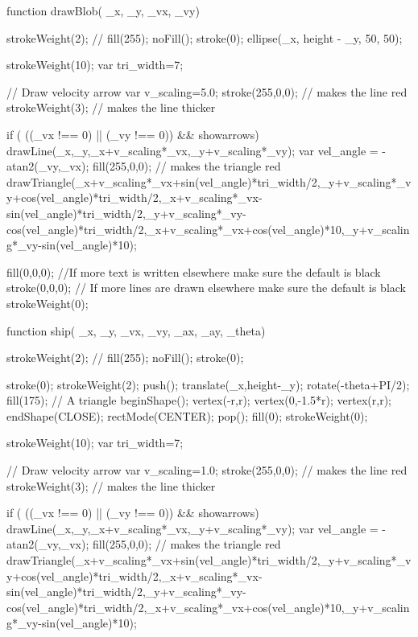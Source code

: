 \documentclass{ximera}
\begin{document}
\begin{javascriptCode}
function drawBlob( _x,  _y, _vx, _vy){
    strokeWeight(2);
    //    fill(255);
    noFill();
    stroke(0);
    ellipse(_x, height - _y, 50, 50);  
  
            strokeWeight(10);
    var tri_width=7;

    // Draw velocity arrow
    var v_scaling=5.0;
    stroke(255,0,0); // makes the line red
    strokeWeight(3); // makes the line thicker

    if ( ((_vx !== 0) || (_vy !== 0)) && showarrows) {
        drawLine(_x,_y,_x+v_scaling*_vx,_y+v_scaling*_vy);
        var vel_angle = -atan2(_vy,_vx);
        fill(255,0,0); // makes the triangle red
        drawTriangle(_x+v_scaling*_vx+sin(vel_angle)*tri_width/2,_y+v_scaling*_vy+cos(vel_angle)*tri_width/2,_x+v_scaling*_vx-sin(vel_angle)*tri_width/2,_y+v_scaling*_vy-cos(vel_angle)*tri_width/2,_x+v_scaling*_vx+cos(vel_angle)*10,_y+v_scaling*_vy-sin(vel_angle)*10);
    }
  


      fill(0,0,0); //If more text is written elsewhere make sure the default is black
    stroke(0,0,0); // If more lines are drawn elsewhere make sure the default is black
    strokeWeight(0);

}



function ship( _x,  _y, _vx, _vy, _ax, _ay, _theta)
{
    strokeWeight(2);
    //    fill(255);
    noFill();
    stroke(0);

    stroke(0);
    strokeWeight(2);
    push();
    translate(_x,height-_y);
    rotate(-theta+PI/2);
    fill(175);
    // A triangle
    beginShape();
    vertex(-r,r);
    vertex(0,-1.5*r);
    vertex(r,r);
    endShape(CLOSE);
    rectMode(CENTER);
    pop();
    fill(0);
    strokeWeight(0);
  
  
  
    strokeWeight(10);
    var tri_width=7;

    // Draw velocity arrow
    var v_scaling=1.0;
    stroke(255,0,0); // makes the line red
    strokeWeight(3); // makes the line thicker

    if ( ((_vx !== 0) || (_vy !== 0)) && showarrows) {
        drawLine(_x,_y,_x+v_scaling*_vx,_y+v_scaling*_vy);
        var vel_angle = -atan2(_vy,_vx);
        fill(255,0,0); // makes the triangle red
        drawTriangle(_x+v_scaling*_vx+sin(vel_angle)*tri_width/2,_y+v_scaling*_vy+cos(vel_angle)*tri_width/2,_x+v_scaling*_vx-sin(vel_angle)*tri_width/2,_y+v_scaling*_vy-cos(vel_angle)*tri_width/2,_x+v_scaling*_vx+cos(vel_angle)*10,_y+v_scaling*_vy-sin(vel_angle)*10);
    }

}
\end{javascriptCode}
\end{document}
